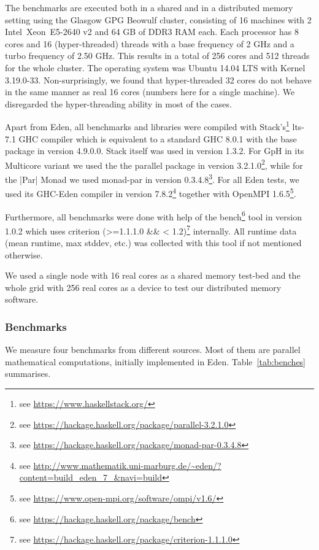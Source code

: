 The benchmarks are executed  both in a shared and in a distributed memory setting using the Glasgow GPG Beowulf cluster, consisting of
16 machines with 2 Intel\SymbReg~Xeon\SymbReg~E5-2640 v2 and 64 GB of DDR3 RAM each. Each processor has 8 cores and 16 (hyper-threaded) threads with a base frequency of 2 GHz and a turbo frequency of 2.50 GHz. This results in a total of 256 cores and 512 threads for the whole cluster. The operating system was Ubuntu 14.04 LTS with Kernel 3.19.0-33. Non-surprisingly, we found that hyper-threaded 32 cores do not behave in the same manner as real 16 cores (numbers here for a single machine). We disregarded the hyper-threading ability in most of the cases.

Apart from Eden, all benchmarks and libraries were compiled with Stack's\footnote{see \url{https://www.haskellstack.org/}} lts-7.1 GHC compiler which is equivalent to a standard GHC 8.0.1 with the base package in version 4.9.0.0. Stack itself was used in version 1.3.2. For GpH in its Multicore variant we used the the parallel package in version 3.2.1.0\footnote{see \url{https://hackage.haskell.org/package/parallel-3.2.1.0}}, while for the |Par| Monad we used monad-par in version 0.3.4.8\footnote{see \url{https://hackage.haskell.org/package/monad-par-0.3.4.8}}. For all Eden tests, we used its GHC-Eden compiler in version 7.8.2\footnote{see \url{http://www.mathematik.uni-marburg.de/~eden/?content=build_eden_7_&navi=build}} together with OpenMPI 1.6.5\footnote{see \url{https://www.open-mpi.org/software/ompi/v1.6/}}.

Furthermore, all benchmarks were done with help of the bench\footnote{see \url{https://hackage.haskell.org/package/bench}} tool in version 1.0.2 which uses criterion (>=1.1.1.0 \&\& < 1.2)\footnote{see \url{https://hackage.haskell.org/package/criterion-1.1.1.0}} internally. All runtime data (mean runtime, max stddev, etc.) was collected with this tool if not mentioned otherwise.

We used a single node with 16 real cores as a shared memory test-bed
and the whole grid with 256 real cores as a device to test our
distributed memory software.

\subsubsection{Benchmarks}

We measure four benchmarks from different
sources. Most of them are parallel mathematical computations, initially
implemented in Eden. Table~\ref{tab:benches} summarises.

